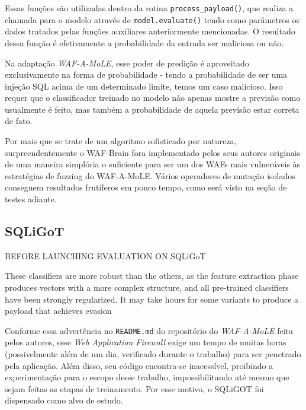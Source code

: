 Essas funções são utilizadas dentro da rotina \verb+process_payload()+, que realiza a chamada para o modelo através de \verb+model.evaluate()+ tendo como parâmetros os dados tratados pelas funções auxiliares anteriormente mencionadas. O resultado dessa função é efetivamente a probabilidade da entrada ser maliciosa ou não.

Na adaptação \textit{WAF-A-MoLE}, esse poder de predição é aproveitado exclusivamente na forma de probabilidade - tendo a probabilidade de ser uma injeção SQL acima de um determinado limite, temos um caso malicioso. Isso requer que o classificador treinado no modelo não apenas mostre a previsão como usualmente é feito, mas também a probabilidade de aquela previsão estar correta de fato.

Por mais que se trate de um algoritmo sofisticado por natureza, surpreendentemente o WAF-Brain fora implementado pelos seus autores originais de uma maneira simplória o suficiente para ser um dos WAFs mais vulneráveis às estratégias de fuzzing do WAF-A-MoLE. Vários operadores de mutação isolados conseguem resultados frutíferos em pouco tempo, como será visto na seção de testes adiante.

\subsection{SQLiGoT}

\begin{citacao}[english]
BEFORE LAUNCHING EVALUATION ON SQLiGoT

These classifiers are more robust than the others, as the feature extraction phase produces vectors with a more complex structure, and all pre-trained classifiers have been strongly regularized. It may take hours for some variants to produce a payload that achieves evasion
\end{citacao}
\bigskip

Conforme essa advertência no \verb+README.md+ do repositório do \textit{WAF-A-MoLE} feita pelos autores, esse \textit{Web Application Firewall} exige um tempo de muitas horas (possivelmente além de um dia, verificado durante o trabalho) para ser penetrado pela aplicação. Além disso, seu código encontra-se inacessível, proibindo a experimentação para o escopo desse trabalho, impossibilitando até mesmo que sejam feitas as etapas de treinamento. Por esse motivo, o SQLiGOT \cite{kar2016sqligot} foi dispensado como alvo de estudo.

